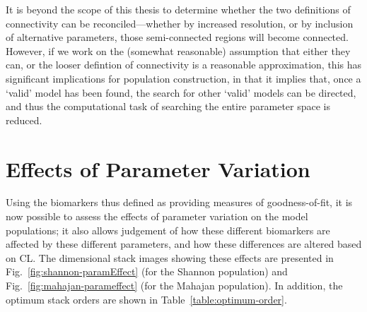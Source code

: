\documentclass[../thesis-main.tex]{subfiles}
\begin{document}
It is beyond the scope of this thesis to determine whether the two definitions of connectivity can be reconciled---whether by increased resolution, or by inclusion of alternative parameters, those semi-connected regions will become connected. However, if we work on the (somewhat reasonable) assumption that either they can, or the looser defintion of connectivity is a reasonable approximation, this has significant implications for population construction, in that it implies that, once a `valid' model has been found, the search for other `valid' models can be directed, and thus the computational task of searching the entire parameter space is reduced.

\section{Effects of Parameter Variation}
\label{sec:param-effects}
Using the biomarkers thus defined as providing measures of goodness-of-fit, it is now possible to assess the effects of parameter variation on the model populations; it also allows judgement of how these different biomarkers are affected by these different parameters, and how these differences are altered based on CL. The dimensional stack images showing these effects are presented in Fig.~\ref{fig:shannon-paramEffect} (for the Shannon population) and Fig.~\ref{fig:mahajan-parameffect} (for the Mahajan population). In addition, the optimum stack orders are shown in Table~\ref{table:optimum-order}.
\end{document}

